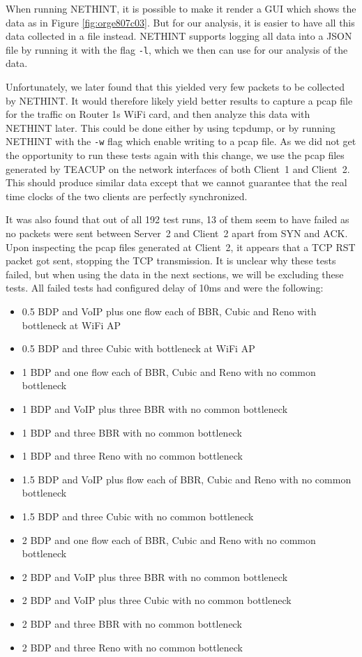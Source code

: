 \documentclass[a4paper,11pt]{article}
\begin{document}
When running NETHINT, it is possible to make it render a GUI which shows the data as in Figure \ref{fig:orge807c03}. But for our analysis, it is easier to have all this data collected in a file instead. NETHINT supports logging all data into a JSON file by running it with the flag \texttt{-l}, which we then can use for our analysis of the data.

Unfortunately, we later found that this yielded very few packets to be collected by NETHINT. It would therefore likely yield better results to capture a pcap file for the traffic on Router 1s WiFi card, and then analyze this data with NETHINT later. This could be done either by using tcpdump, or by running NETHINT with the \texttt{-w} flag which enable writing to a pcap file. As we did not get the opportunity to run these tests again with this change, we use the pcap files generated by TEACUP on the network interfaces of both Client~1 and Client~2. This should produce similar data except that we cannot guarantee that the real time clocks of the two clients are perfectly synchronized.

It was also found that out of all 192 test runs, 13 of them seem to have failed as no packets were sent between Server~2 and Client~2 apart from SYN and ACK. Upon inspecting the pcap files generated at Client~2, it appears that a TCP RST packet got sent, stopping the TCP transmission. It is unclear why these tests failed, but when using the data in the next sections, we will be excluding these tests. All failed tests had configured delay of 10ms and were the following:

\begin{itemize}
\item 0.5 BDP and VoIP plus one flow each of BBR, Cubic and Reno with bottleneck at WiFi AP
\item 0.5 BDP and three Cubic with bottleneck at WiFi AP
\item 1 BDP and one flow each of BBR, Cubic and Reno with no common bottleneck
\item 1 BDP and VoIP plus three BBR with no common bottleneck
\item 1 BDP and three BBR with no common bottleneck
\item 1 BDP and three Reno with no common bottleneck
\item 1.5 BDP and VoIP plus flow each of BBR, Cubic and Reno with no common bottleneck
\item 1.5 BDP and three Cubic with no common bottleneck
\item 2 BDP and one flow each of BBR, Cubic and Reno with no common bottleneck
\item 2 BDP and VoIP plus three BBR with no common bottleneck
\item 2 BDP and VoIP plus three Cubic with no common bottleneck
\item 2 BDP and three BBR with no common bottleneck
\item 2 BDP and three Reno with no common bottleneck
\end{itemize}
\end{document}
